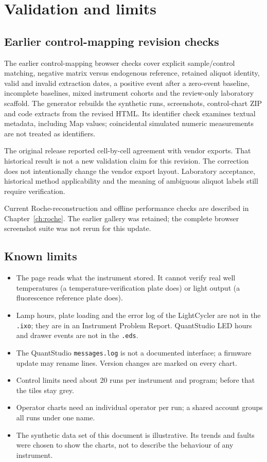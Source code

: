 \chapter{Validation and limits}\label{ch:validation}

\section{Earlier control-mapping revision checks}
The earlier control-mapping browser checks cover explicit sample/control matching, negative matrix versus endogenous reference, retained aliquot
identity, valid and invalid extraction dates, a positive event after a zero-event baseline, incomplete baselines, mixed
instrument cohorts and the review-only laboratory scaffold. The generator rebuilds the synthetic runs, screenshots,
control-chart ZIP and code extracts from the revised HTML. Its identifier check examines textual metadata, including
Map values; coincidental simulated numeric measurements are not treated as identifiers.

The original release reported cell-by-cell agreement with vendor exports. That historical result is not a new validation
claim for this revision. The correction does not intentionally change the vendor export layout. Laboratory acceptance,
historical method applicability and the meaning of ambiguous aliquot labels still require verification.

Current Roche-reconstruction and offline performance checks are described in Chapter~\ref{ch:roche}. The earlier gallery was retained; the complete browser screenshot suite was not rerun for this update.

\section{Known limits}
\begin{itemize}
\item The page reads what the instrument stored. It cannot verify real well temperatures (a temperature-verification plate does)
      or light output (a fluorescence reference plate does).
\item Lamp hours, plate loading and the error log of the LightCycler are not in the \texttt{.ixo}; they are in an Instrument Problem
      Report. QuantStudio LED hours and drawer events are not in the \texttt{.eds}.
\item The QuantStudio \texttt{messages.log} is not a documented interface; a firmware update may rename lines. Version changes are
      marked on every chart.
\item Control limits need about 20 runs per instrument and program; before that the tiles stay grey.
\item Operator charts need an individual operator per run; a shared account groups all runs under one name.
\item The synthetic data set of this document is illustrative. Its trends and faults were chosen to show the charts, not to
      describe the behaviour of any instrument.
\end{itemize}
